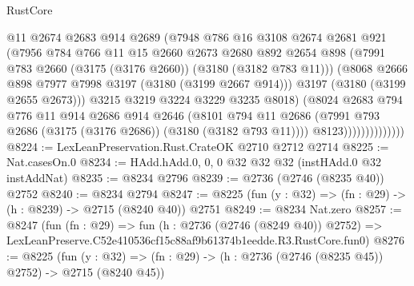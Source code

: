 \begin{lexlean}{RustCore}
\begin{coremodule}
                              @11
                              @2674
                              @2683
                              @914
                              @2689
                              (@7948
                                @786
                                @16
                                @3108
                                @2674
                                @2681
                                @921
                                (@7956
                                  @784
                                  @766
                                  @11
                                  @15
                                  @2660
                                  @2673
                                  @2680
                                  @892
                                  @2654
                                  @898
                                  (@7991 @783 @2660 (@3175 (@3176 @2660)) (@3180 (@3182 @783 @11)))
                                  (@8068 @2666 @898 @7977 @7998 @3197 (@3180 (@3199 @2667 @914)))
                                  @3197
                                  (@3180 (@3199 @2655 @2673)))
                                @3215
                                @3219
                                @3224
                                @3229
                                @3235
                                @8018)
                              (@8024
                                @2683
                                @794
                                @776
                                @11
                                @914
                                @2686
                                @914
                                @2646
                                (@8101
                                  @794
                                  @11
                                  @2686
                                  (@7991 @793 @2686 (@3175 (@3176 @2686)) (@3180 (@3182 @793 @11))))
                                @8123))))))))))))))
@8224 := LexLeanPreservation.Rust.CrateOK @2710 @2712 @2714
@8225 := Nat.casesOn.{0}
@8234 := HAdd.hAdd.{0, 0, 0} @32 @32 @32 (instHAdd.{0} @32 instAddNat)
@8235 := @8234 @2796
@8239 := @2736 (@2746 (@8235 @40)) @2752
@8240 := @8234 @2794
@8247 := @8225 (fun (y : @32) => (fn : @29) -> (h : @8239) -> @2715 (@8240 @40)) @2751
@8249 := @8234 Nat.zero
@8257 := @8247
    (fun (fn : @29) =>
    fun (h : @2736 (@2746 (@8249 @40)) @2752) =>
    LexLeanPreserve.C52e410536cf15c88af9b61374b1eedde.R3.RustCore.fun0)
@8276 := @8225
    (fun (y : @32) => (fn : @29) -> (h : @2736 (@2746 (@8235 @45)) @2752) -> @2715 (@8240 @45))

\end{coremodule}
\end{lexlean}

